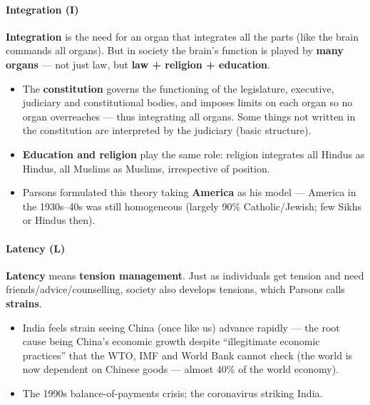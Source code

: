 \paragraph{Integration (I)}
\textbf{Integration} is the need for an organ that integrates all the parts (like the brain commands all organs). But in society the brain's function is played by \textbf{many organs} --- not just law, but \textbf{law + religion + education}.

\begin{KeyConcept}
\begin{itemize}
\item The \textbf{constitution} governs the functioning of the legislature, executive, judiciary and constitutional bodies, and imposes limits on each organ so no organ overreaches --- thus integrating all organs. Some things not written in the constitution are interpreted by the judiciary (basic structure).
\item \textbf{Education and religion} play the same role: religion integrates all Hindus as Hindus, all Muslims as Muslims, irrespective of position.
\end{itemize}
\end{KeyConcept}

\begin{CriticalPoint}
\begin{itemize}
\item Parsons formulated this theory taking \textbf{America} as his model --- America in the 1930s--40s was still homogeneous (largely 90\% Catholic/Jewish; few Sikhs or Hindus then).
\end{itemize}
\end{CriticalPoint}

\paragraph{Latency (L)}
\textbf{Latency} means \textbf{tension management}. Just as individuals get tension and need friends/advice/counselling, society also develops tensions, which Parsons calls \textbf{strains}.

\begin{ExampleBox}
\begin{itemize}
\item India feels strain seeing China (once like us) advance rapidly --- the root cause being China's economic growth despite ``illegitimate economic practices'' that the WTO, IMF and World Bank cannot check (the world is now dependent on Chinese goods --- almost 40\% of the world economy).
\item The 1990s balance-of-payments crisis; the coronavirus striking India.
\end{itemize}
\end{ExampleBox}

